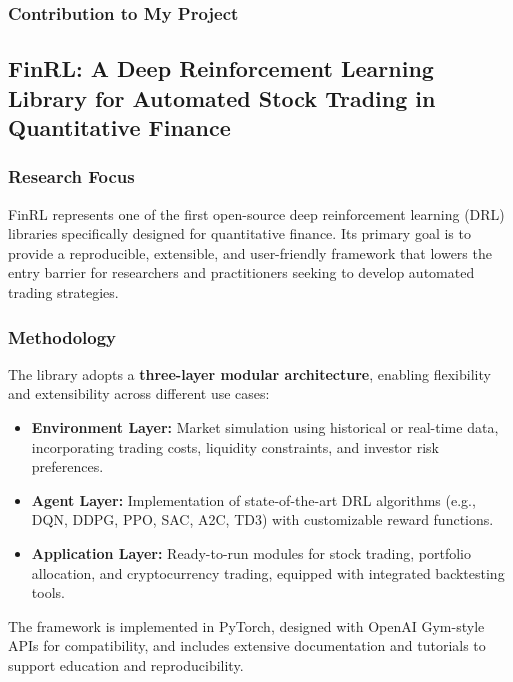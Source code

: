 \documentclass[12pt,a4paper]{report}
\begin{document}
\subsubsection{Contribution to My Project}




\subsection{FinRL: A Deep Reinforcement Learning Library for Automated Stock Trading in Quantitative Finance \cite{liu2020finrl}}

\subsubsection{Research Focus}
FinRL represents one of the first open-source deep reinforcement learning (DRL) libraries specifically designed for quantitative finance. Its primary goal is to provide a reproducible, extensible, and user-friendly framework that lowers the entry barrier for researchers and practitioners seeking to develop automated trading strategies.

\subsubsection{Methodology}
The library adopts a \textbf{three-layer modular architecture}, enabling flexibility and extensibility across different use cases:
\begin{itemize}
    \item \textbf{Environment Layer:} Market simulation using historical or real-time data, incorporating trading costs, liquidity constraints, and investor risk preferences.  
    \item \textbf{Agent Layer:} Implementation of state-of-the-art DRL algorithms (e.g., DQN, DDPG, PPO, SAC, A2C, TD3) with customizable reward functions.  
    \item \textbf{Application Layer:} Ready-to-run modules for stock trading, portfolio allocation, and cryptocurrency trading, equipped with integrated backtesting tools.  
\end{itemize}

The framework is implemented in PyTorch, designed with OpenAI Gym-style APIs for compatibility, and includes extensive documentation and tutorials to support education and reproducibility.
\end{document}
